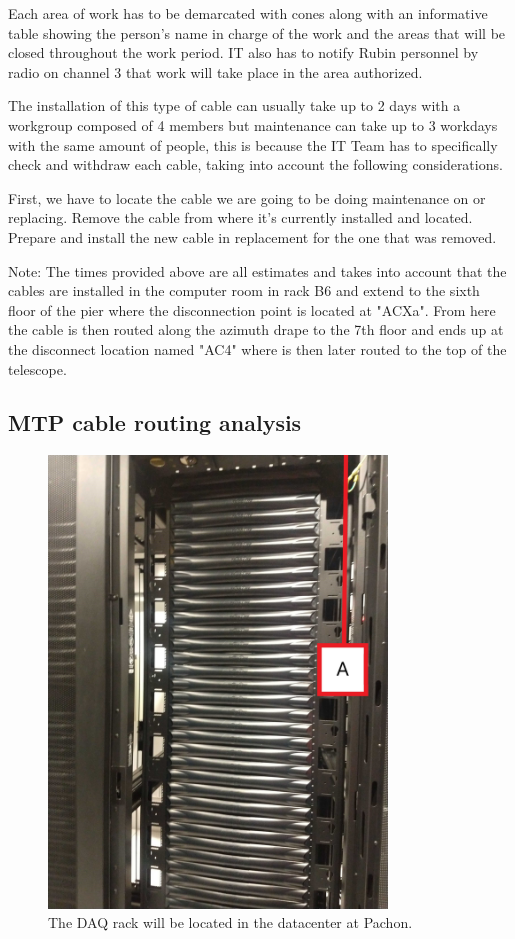   Each area of work has to be demarcated with cones along with an informative table showing the person's name in charge of the work and the areas that will be closed throughout the work period. IT also has to notify Rubin personnel by radio on channel 3 that work will take place in the area authorized.

  The installation of this type of cable can usually take up to 2 days with a workgroup composed of 4 members but maintenance can take up to 3 workdays with the same amount of people, this is because the IT Team has to specifically check and withdraw each cable, taking into account the following considerations.

  First, we have to locate the cable we are going to be doing maintenance on or replacing.
  Remove the cable from where it's currently installed and located.
  Prepare and install the new cable in replacement for the one that was removed.


  Note: The times provided above are all estimates and takes into account that the cables are installed in the computer room in rack B6 and extend to the sixth floor of the pier where the disconnection point is located at "ACXa". From here the cable is then routed along the azimuth drape to the 7th floor and ends up at the disconnect location named "AC4" where is then later routed to the top of the telescope.

\newpage
\subsection{MTP cable routing analysis}

\begin{figure}
  \centering
  \includegraphics[width=9cm]{images/111.jpg}
  \caption*{The DAQ rack will be located in the datacenter at Pachon.} 
\end{figure}
  

